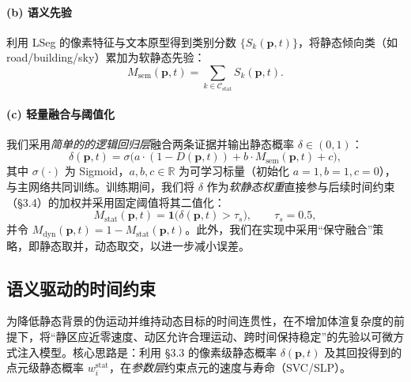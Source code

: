 \documentclass[10pt,conference]{IEEEtran} %
\begin{document}
\paragraph{(b) 语义先验}
利用 LSeg 的像素特征与文本原型得到类别分数 $\{S_k(\mathbf p,t)\}$，将静态倾向类（如 road/building/sky）累加为软静态先验：
\begin{equation}
M_{\mathrm{sem}}(\mathbf p,t)=\sum_{k\in\mathcal C_{\mathrm{stat}}} S_k(\mathbf p,t).
\label{eq:demm_sem}
\end{equation}

\paragraph{(c) 轻量融合与阈值化}
我们采用\emph{简单的的逻辑回归层}融合两条证据并输出静态概率 $\delta\in(0,1)$：
\begin{equation}
\delta(\mathbf p,t)=\sigma\!\big(a\cdot(1-D(\mathbf p,t))+b\cdot M_{\mathrm{sem}}(\mathbf p,t)+c\big),
\label{eq:demm_delta_final}
\end{equation}
其中 $\sigma(\cdot)$ 为 Sigmoid，$a,b,c\in\mathbb{R}$ 为可学习标量（初始化 $a{=}1,b{=}1,c{=}0$），与主网络共同训练。训练期间，我们将 $\delta$ 作为\emph{软静态权重}直接参与后续时间约束（§3.4）的加权并采用固定阈值将其二值化：
\begin{equation}
M_{\mathrm{stat}}(\mathbf p,t)=\mathbf{1}\!\big(\delta(\mathbf p,t)>\tau_s\big),\qquad \tau_s=0.5,
\label{eq:demm_binarize_final}
\end{equation}
并令 $M_{\mathrm{dyn}}(\mathbf p,t)=1-M_{\mathrm{stat}}(\mathbf p,t)$。此外，我们在实现中采用“保守融合”策略，即静态取并，动态取交，以进一步减小误差。

\subsection{语义驱动的时间约束}
为降低静态背景的伪运动并维持动态目标的时间连贯性，在不增加体渲复杂度的前提下，将“静区应近零速度、动区允许合理运动、跨时间保持稳定”的先验以可微方式注入模型。核心思路是：利用 §3.3 的像素级静态概率 $\delta(\mathbf p,t)$ 及其回投得到的点元级静态概率 $w_i^{\mathrm{stat}}$，在\emph{参数层}约束点元的速度与寿命（SVC/SLP）。
\end{document}
